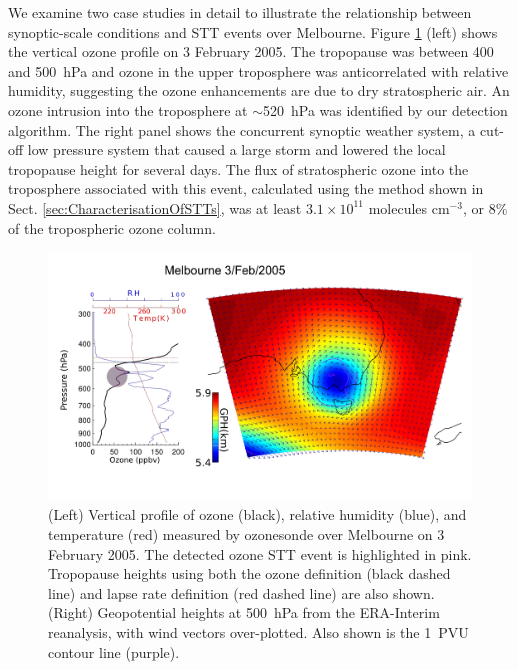 \documentclass[acp, manuscript]{copernicus} %
\begin{document}
    We examine two case studies in detail to illustrate the relationship between synoptic-scale conditions and STT events  over Melbourne.
    Figure \ref{fig:Melbourne20050203} (left) shows the vertical ozone profile on 3 February 2005.
    The tropopause was between 400 and 500~hPa and ozone in the upper troposphere was anticorrelated with relative humidity, suggesting the ozone enhancements are due to dry stratospheric air. 
    An ozone intrusion into the troposphere at $\sim$520~hPa was identified by our detection algorithm.
    The right panel shows the concurrent synoptic weather system, a cut-off low pressure system that caused a large storm and lowered the local tropopause height for several days.
    The flux of stratospheric ozone into the troposphere associated with this event, calculated using the method shown in Sect. \ref{sec:CharacterisationOfSTTs}, was at least $3.1 \times 10^{11}$ molecules cm$^{-3}$, or 8\% of the tropospheric ozone column.

    \begin{figure}[t]
      \includegraphics[width=14.0cm]{figures/Melbourne20050203.png}
      \caption{(Left) Vertical profile of ozone (black), relative humidity (blue), and temperature (red) measured by ozonesonde over Melbourne on 3 February 2005.
      The detected ozone STT event is highlighted in pink.
      Tropopause heights using both the ozone definition (black dashed line) and lapse rate definition (red dashed line) are also shown.
      (Right) Geopotential heights at 500~hPa from the ERA-Interim reanalysis, with wind vectors over-plotted.
      Also shown is the 1~PVU contour line (purple).}
      \label{fig:Melbourne20050203}
    \end{figure}
    
\end{document}
